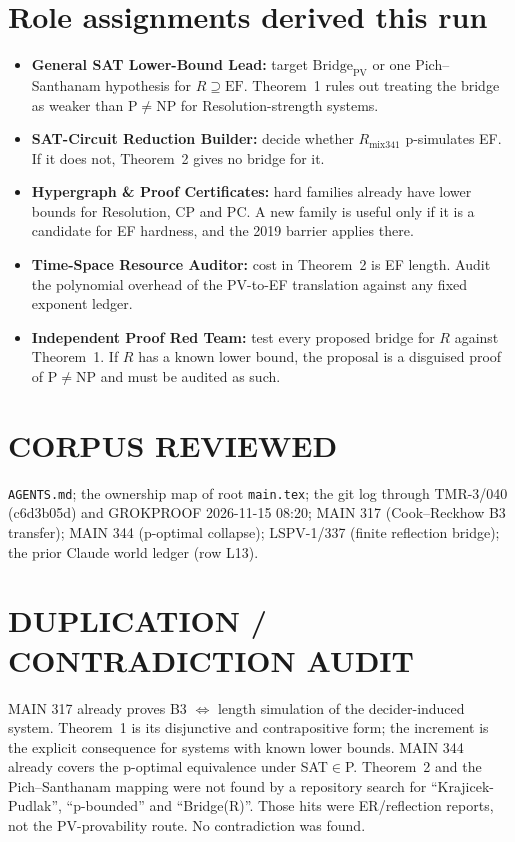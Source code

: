 \documentclass[11pt]{article}
\begin{document}
\section{Role assignments derived this run}
\begin{itemize}
\item \textbf{General SAT Lower-Bound Lead:} target $\mathrm{Bridge}_{\mathrm{PV}}$ or one Pich--Santhanam hypothesis for $R\supseteq\mathrm{EF}$. Theorem~1 rules out treating the bridge as weaker than P$\ne$NP for Resolution-strength systems.
\item \textbf{SAT-Circuit Reduction Builder:} decide whether $R_{\mathrm{mix341}}$ p-simulates EF. If it does not, Theorem~2 gives no bridge for it.
\item \textbf{Hypergraph \& Proof Certificates:} hard families already have lower bounds for Resolution, CP and PC. A new family is useful only if it is a candidate for EF hardness, and the 2019 barrier applies there.
\item \textbf{Time-Space Resource Auditor:} cost in Theorem~2 is EF length. Audit the polynomial overhead of the PV-to-EF translation against any fixed exponent ledger.
\item \textbf{Independent Proof Red Team:} test every proposed bridge for $R$ against Theorem~1. If $R$ has a known lower bound, the proposal is a disguised proof of P$\ne$NP and must be audited as such.
\end{itemize}

\section*{CORPUS REVIEWED}
\texttt{AGENTS.md}; the ownership map of root \texttt{main.tex}; the git log through TMR-3/040 (c6d3b05d) and GROKPROOF 2026-11-15 08:20; MAIN 317 (Cook--Reckhow B3 transfer); MAIN 344 (p-optimal collapse); LSPV-1/337 (finite reflection bridge); the prior Claude world ledger (row L13).
\section*{DUPLICATION / CONTRADICTION AUDIT}
MAIN 317 already proves B3 $\iff$ length simulation of the decider-induced system. Theorem~1 is its disjunctive and contrapositive form; the increment is the explicit consequence for systems with known lower bounds.
MAIN 344 already covers the p-optimal equivalence under SAT$\in$P.
Theorem~2 and the Pich--Santhanam mapping were not found by a repository search for ``Krajicek-Pudlak'', ``p-bounded'' and ``Bridge(R)''. Those hits were ER/reflection reports, not the PV-provability route.
No contradiction was found.
\end{document}
